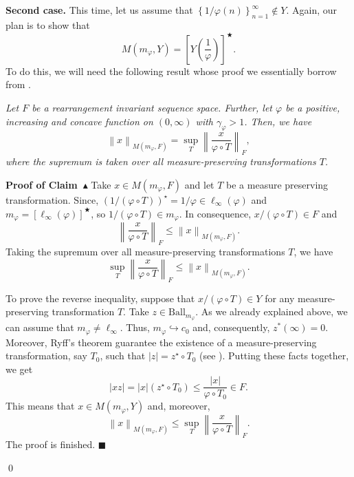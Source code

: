 \documentclass[11pt]{amsart}
\theoremstyle{definition}
\theoremstyle{definition}
\theoremstyle{definition}
\theoremstyle{definition}
\theoremstyle{definition}
\theoremstyle{definition}
\theoremstyle{definition}
\theoremstyle{definition}
\numberwithin{equation}{section}
\numberwithin{equation}{section}
\numberwithin{equation}{section}
\theoremstyle{definition}
\theoremstyle{definition}
\theoremstyle{definition}
\theoremstyle{definition}
\theoremstyle{definition}
\theoremstyle{definition}
\newcommand{\norm}[1]{\left\lVert#1\right\rVert}
\newcommand{\abs}[1]{\left\lvert#1\right\rvert}
\renewenvironment{proof}{\noindent {\bf Proof.}}{\qed}
\begin{document}
\begin{proof}
			{\bf Second case.} This time, let us assume that $\left\{ 1 / \varphi(n) \right\}_{n=1}^{\infty} \notin Y$.
			Again, our plan is to show that
			\begin{equation} \label{EQ: idea KLM14}
				M(m_{\varphi},Y) = \left[ Y\left( \frac{1}{\varphi} \right) \right]^{\bigstar}.
			\end{equation}
			To do this, we will need the following result whose proof we essentially borrow from \cite[p.~653]{KLM14}.
			
			\vspace{5pt} 
			{\it Let $F$ be a rearrangement invariant sequence space.
			Further, let $\varphi$ be a positive, increasing and concave function on $(0,\infty)$ with $\gamma_{\varphi} > 1$.
			Then, we have}
			\begin{equation*} \label{EQ: equality}
				\norm{x}_{M(m_{\varphi},F)} = \sup\limits_{T} \norm{\frac{x}{\varphi \circ T}}_F,
			\end{equation*}
			{\it where the supremum is taken over all measure-preserving transformations $T$.}
			
			\vspace{5pt}
			\noindent
			{\bf Proof of Claim~$\blacktriangle$}
			Take $x \in M(m_{\varphi},F)$ and let $T$ be a measure preserving transformation.
			Since, $\left( 1 / (\varphi \circ T) \right)^{\star} = 1 / \varphi \in \ell_{\infty}(\varphi)$
			and $m_{\varphi} = [\ell_{\infty}(\varphi)]^{\bigstar}$,
			so $1 / (\varphi \circ T) \in m_{\varphi}$.
			In consequence, $x / (\varphi \circ T) \in F$ and
			\begin{equation*}
				\norm{\frac{x}{\varphi \circ T}}_F \leqslant \norm{x}_{M(m_{\varphi},F)}.
			\end{equation*}
			Taking the supremum over all measure-preserving transformations $T$, we have
			\begin{equation*}
				\sup\limits_{T} \norm{\frac{x}{\varphi \circ T}}_F \leqslant \norm{x}_{M(m_{\varphi},F)}.
			\end{equation*}
		
			To prove the reverse inequality, suppose that $x / (\varphi \circ T) \in Y$ for any measure-preserving transformation $T$.
			Take $z \in \text{Ball}_{m_{\varphi}}$. As we already explained above, we can assume that $m_{\varphi} \neq \ell_{\infty}$.
			Thus, $m_{\varphi} \hookrightarrow c_0$ and, consequently, $z^*(\infty) = 0$.
			Moreover, Ryff's theorem guarantee the existence of a measure-preserving transformation, say $T_0$,
			such that $\abs{z} = z^{\star} \circ T_0$ (see \cite[Theorem~7.5, p.~82]{BS88}).
			Putting these facts together, we get
			\begin{equation*}
				\abs{xz} = \abs{x}(z^{\star} \circ T_0) \leqslant \frac{\abs{x}}{\varphi \circ T_0} \in F.
			\end{equation*}
			This means that $x \in M(m_{\varphi},Y)$ and, moreover,
			\begin{equation*}
				\norm{x}_{M(m_{\varphi},F)} \leqslant \sup\limits_{T} \norm{\frac{x}{\varphi \circ T}}_F.
			\end{equation*}
			The proof is finished.
			\hfill $\blacksquare$
			\vspace{5pt} \noindent
			

\end{proof}
\end{document}
